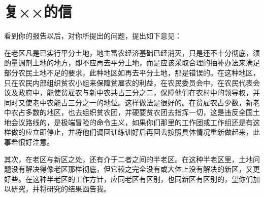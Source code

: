 \section[复××的信（一九四八年二月十七日）]{复××的信}


看到你的报告以后，对你所提出的问题，提出如下意见：

在老区凡是已实行平分土地，地主富农经济基础已经消灭，只是还不十分彻底，须酌量调剂土地的地方，即不应再去平分土地，而是应该采取合理的抽补办法来满足部分农民土地不足的要求，此种地区如再去平分土地，那是错误的。在这种地区，只在农民内部组织贫农小组来保障贫雇农的利益，在农民委员会中，在农民代表会议及政府中，能使贫雇农与新中农共占三分之二，保障他们在农村中的领导权，并同时又使老中农能占三分之一的地位。这样做法是很好的。在贫雇农占少数，新老中农占多数的地区，也去组织贫农团，并硬要贫农团去指挥一切，这是违反全国土地会议路线的，是极端冒险的命令主义，如果你们那里的工作团或工作组还是有这样做的应立即停止，并将他们调回训练训好后再回去按照具体情况重新做起来，此事希很好注意。

其次，在老区与新区之处，还有介于二者之间的半老区。在这种半老区里，土地问题没有解决得像老区那样彻底，但它较之完全没有或大体上没有解决的新区，又更好些。在这种半老区的工作方针，应同老区有区别，也同新区有区别的，望你们加以研究，并将研究的结果函告我。

